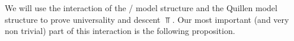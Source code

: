 We will use the interaction of the \Strom/ model structure and the Quillen model structure to prove universality and descent $\Top$.
Our most important (and very non trivial) part of this interaction is the following proposition.
